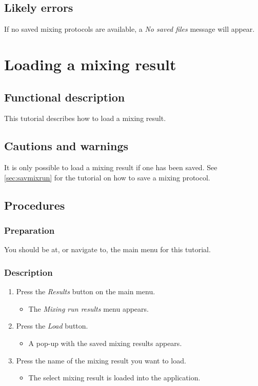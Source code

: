 \subsection{Likely errors}
If no saved mixing protocols are available, a \emph{No saved files} message will appear.


\section{Loading a mixing result}
\label{sec:loadMixResult}

\subsection{Functional description}
This tutorial describes how to load a mixing result.

\subsection{Cautions and warnings}
It is only possible to load a mixing result if one has been saved. See \ref{sec:savmixrun} for the tutorial on how to save a mixing protocol.

\subsection{Procedures}
\subsubsection{Preparation}
You should be at, or navigate to, the main menu for this tutorial.

\subsubsection{Description}

\begin{enumerate}
	\item Press the \emph{Results} button on the main menu.
		\begin{itemize}
           \item  The \emph{Mixing run results} menu appears.
		\end{itemize}
	\item Press the \emph{Load} button.
		\begin{itemize}
            \item A pop-up with the saved mixing results appears.
		\end{itemize}
	\item  Press the name of the mixing result you want to load.
		\begin{itemize}
           \item  The select mixing result is loaded into the application.
		\end{itemize}
\end{enumerate}


